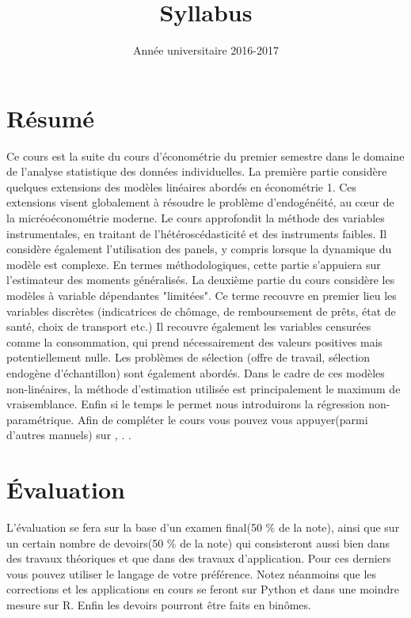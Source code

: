\documentclass[12pt, reqno]{amsart}
\title{Syllabus}
\date{Année universitaire 2016-2017}
\begin{document}
\maketitle
\section{Résumé}
Ce cours est la suite du cours d'économétrie du premier semestre dans le domaine de l'analyse statistique des données individuelles. La première partie considère quelques extensions des modèles linéaires abordés en économétrie 1. Ces extensions visent globalement à résoudre le problème d'endogénéité, au cœur de la micréoéconométrie moderne. Le cours approfondit la méthode des variables instrumentales, en traitant de l'hétéroscédasticité et des instruments faibles. Il considère également  l'utilisation des panels, y compris lorsque la dynamique du modèle est complexe. En termes méthodologiques, cette partie s'appuiera sur l'estimateur des moments généralisés. La deuxième partie du cours considère les modèles à variable dépendantes "limitées". Ce terme recouvre en premier lieu les variables discrètes (indicatrices de chômage, de remboursement de prêts, état de santé, choix de transport etc.) Il recouvre également les variables censurées comme la consommation, qui prend nécessairement des valeurs positives mais potentiellement nulle. Les problèmes de sélection (offre de travail, sélection endogène d'échantillon) sont également abordés. Dans le cadre de ces modèles non-linéaires, la méthode d'estimation utilisée est principalement le maximum de vraisemblance. Enfin si le temps le permet nous introduirons la régression non-paramétrique. Afin de compléter le cours vous pouvez vous appuyer(parmi d'autres manuels)  sur \cite{Wooldridge2010},  \cite{Amemiya1985}. \cite{White1980}.

\section{\'Evaluation}
L'évaluation se fera sur la base d'un examen final(50 $\%$ de la note), ainsi que sur un certain nombre de devoirs(50 $\%$ de la note) qui consisteront aussi bien dans des travaux théoriques et que dans des travaux d'application. Pour ces derniers vous pouvez utiliser le langage de votre préférence. Notez néanmoins que les corrections et les applications en cours se feront sur Python et dans une moindre mesure sur R. Enfin les devoirs pourront être faits en binômes.
\end{document}
